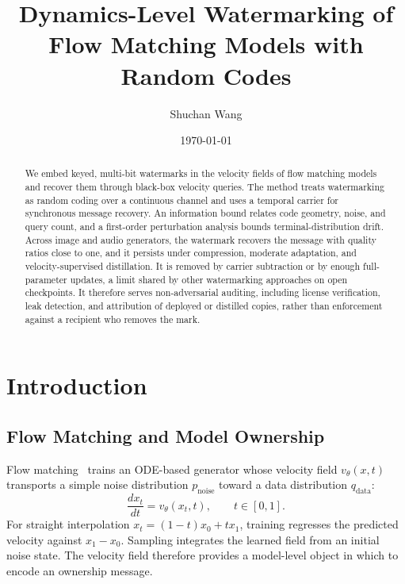 \documentclass[11pt]{article}
\begin{document}
\title{Dynamics-Level Watermarking of Flow Matching Models with Random Codes}
\author{Shuchan Wang}
\date{\today}
\maketitle

\begin{abstract}
We embed keyed, multi-bit watermarks in the velocity fields of flow
matching models and recover them through black-box velocity queries. The
method treats watermarking as random coding over a continuous channel and
uses a temporal carrier for synchronous message recovery. An information
bound relates code geometry, noise, and query count, and a first-order
perturbation analysis bounds terminal-distribution drift. Across image and
audio generators, the watermark recovers the message with quality ratios
close to one, and it persists under compression, moderate adaptation, and
velocity-supervised distillation. It is removed by carrier subtraction or by enough full-parameter updates, a limit shared by other watermarking approaches on open checkpoints. It therefore serves non-adversarial auditing, including license verification, leak detection, and attribution of
deployed or distilled copies, rather than enforcement against a recipient
who removes the mark.
\end{abstract}

\section{Introduction}

\subsection{Flow Matching and Model Ownership}

Flow matching~\cite{lipmanflow,liuflow} trains an ODE-based generator
whose velocity field $v_\theta(x,t)$ transports a simple noise
distribution $p_{\mathrm{noise}}$ toward a data distribution
$q_{\mathrm{data}}$:
\begin{equation}
\frac{dx_t}{dt}=v_\theta(x_t,t),\qquad t\in[0,1].
\end{equation}
For straight interpolation $x_t=(1-t)x_0+tx_1$, training regresses the
predicted velocity against $x_1-x_0$. Sampling integrates the learned
field from an initial noise state. The velocity field therefore
provides a model-level object in which to encode an ownership message.
\end{document}
